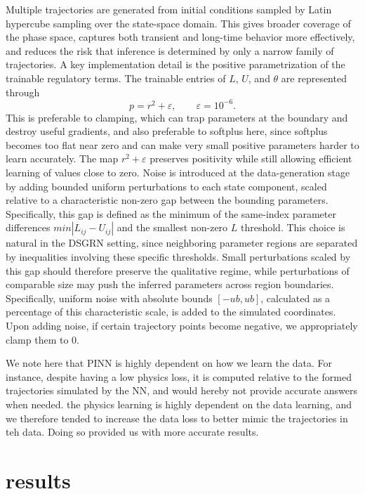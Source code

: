 \documentclass[11pt]{article}
\begin{document}
Multiple trajectories are generated from initial conditions sampled by Latin hypercube sampling over the state-space domain. This gives broader coverage of the phase space, captures both transient and long-time behavior more effectively, and reduces the risk that inference is determined by only a narrow family of trajectories. A key implementation detail is the positive parametrization of the trainable regulatory terms. The trainable entries of \(L\), \(U\), and \(\theta\) are represented through
\[
p = r^2 + \varepsilon, \qquad \varepsilon = 10^{-6}.
\]
This is preferable to clamping, which can trap parameters at the boundary and destroy useful gradients, and also preferable to softplus here, since softplus becomes too flat near zero and can make very small positive parameters harder to learn accurately. The map \(r^2+\varepsilon\) preserves positivity while still allowing efficient learning of values close to zero. Noise is introduced at the data-generation stage by adding bounded uniform perturbations to each state component, scaled relative to a characteristic non-zero gap between the bounding parameters. Specifically, this gap is defined as the minimum of the same-index parameter differences 
$min|L_{ij}-U_{ij}|$ and the smallest non-zero $L$ threshold.  This choice is natural in the DSGRN setting, since neighboring parameter regions are separated by inequalities involving these specific thresholds. Small perturbations scaled by this gap should therefore preserve the qualitative regime, while perturbations of comparable size may push the inferred parameters across region boundaries. Specifically, uniform noise with absolute bounds  $[-ub,ub]$, calculated as a percentage of this characteristic scale, is added to the simulated coordinates. Upon adding noise, if certain trajectory points become negative, we appropriately clamp them to $0$.

\begin{remark}
    We note here that PINN is highly dependent on how we learn the data. For instance, despite having a low physics loss, it is computed relative to the formed trajectories simulated by the NN, and would hereby not provide accurate answers when needed. the physics learning is highly dependent on the data learning, and we therefore tended to increase the data loss to better mimic the trajectories in teh data. Doing so provided us with more accurate results.
\end{remark}
\section{results}
\end{document}
